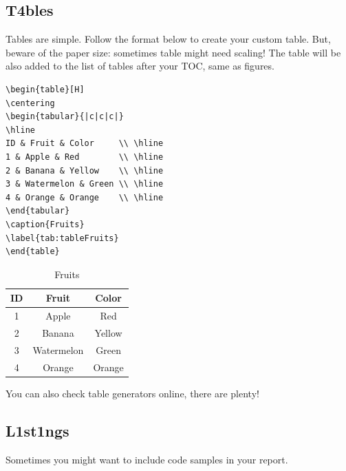 \subsection{T4bles}
Tables are simple. Follow the format below to create your custom table. But, beware of the paper size: sometimes table might need scaling! The table will be also added to the list of tables after your TOC, same as figures.

\begin{verbatim}
\begin{table}[H]
\centering
\begin{tabular}{|c|c|c|}
\hline
ID & Fruit & Color     \\ \hline
1 & Apple & Red        \\ \hline
2 & Banana & Yellow    \\ \hline
3 & Watermelon & Green \\ \hline
4 & Orange & Orange    \\ \hline
\end{tabular}
\caption{Fruits}
\label{tab:tableFruits}
\end{table}
\end{verbatim}

\begin{table}[H]
\centering
\begin{tabular}{|c|c|c|}
\hline
ID & Fruit & Color     \\ \hline
1 & Apple & Red        \\ \hline
2 & Banana & Yellow    \\ \hline
3 & Watermelon & Green \\ \hline
4 & Orange & Orange    \\ \hline
\end{tabular}
\caption{Fruits}
\label{tab:tableFruits}
\end{table}

You can also check table generators online, there are plenty!

\subsection{L1st1ngs}
Sometimes you might want to include code samples in your report.

\begin{verbatim}

\end{verbatim}



